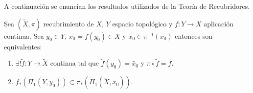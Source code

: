 
A continuación se enuncian los resultados utilizados de la Teoría de Recubridores.

\begin{teorema}
	Sea $(\tilde{X}, \pi)$ recubrimiento de $X$, $Y$ espacio topológico y $f:Y \rightarrow X$ aplicación continua. Sea $y_0 \in Y$, $x_0=f(y_0) \in X$ y $\tilde{x_0} \in \pi^{-1}(x_0)$ entonces son equivalentes:
	\begin{enumerate}
		\item $\exists ! \tilde{f}:Y \rightarrow \tilde{X}$ continua tal que $\tilde{f}(y_0) = \tilde{x_0}$ y $\pi \circ \tilde{f} = f$.
		\item $f_*(\Pi_1(Y, y_0)) \subset \pi_*(\Pi_1(\tilde{X}, \tilde{x_0}))$.
	\end{enumerate}
\end{teorema}

\endinput
